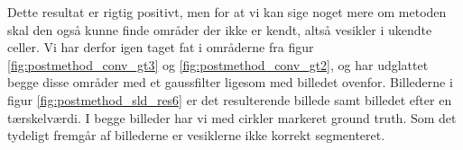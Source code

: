 Dette resultat er rigtig positivt, men for at vi kan sige noget mere om metoden skal den også kunne finde områder der ikke er kendt, altså vesikler i ukendte celler. Vi har derfor igen taget fat i områderne fra figur \ref{fig:postmethod_conv_gt3} og \ref{fig:postmethod_conv_gt2}, og har udglattet begge disse områder med et gaussfilter ligesom med billedet ovenfor. Billederne i figur \ref{fig:postmethod_sld_res6} er det resulterende billede samt billedet efter en tærskelværdi. I begge billeder har vi med cirkler markeret ground truth. Som det tydeligt fremgår af billederne er vesiklerne ikke korrekt segmenteret.


